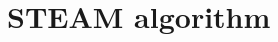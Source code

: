\documentclass[acp, manuscript, english]{copernicus}
\begin{document}


\section{STEAM algorithm} \label{sect:steam algorithm details}
\end{document}

